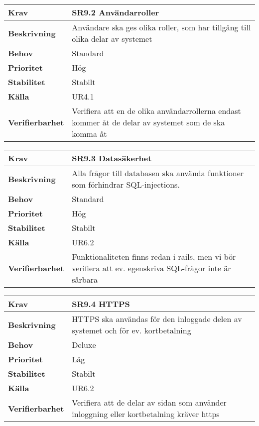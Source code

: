 \documentclass[a4paper, twoside, 11pt, titlepage]{article}
\begin{document}
\begin{tabular} { p{2.6cm} p{12.5cm} }
	\hline
	\sffamily\textbf{Krav} & SR9.2 Användarroller  \\
	\hline
	\sffamily\textbf{Beskrivning} & Användare ska ges olika roller, som har tillgång till olika delar av systemet  \\
	\hline
	\sffamily\textbf{Behov} & Standard  \\
	\hline
	\sffamily\textbf{Prioritet} & Hög  \\
	\hline
	\sffamily\textbf{Stabilitet} & Stabilt  \\
	\hline
	\sffamily\textbf{Källa} & UR4.1  \\
	\hline
	\sffamily\textbf{Verifierbarhet} & Verifiera att en de olika användarrollerna endast kommer åt de delar av systemet som de ska komma åt  \\
	\hline
\end{tabular}
\vspace{6mm}

\begin{tabular} { p{2.6cm} p{12.5cm} }
	\hline
	\sffamily\textbf{Krav} & SR9.3 Datasäkerhet  \\
	\hline
	\sffamily\textbf{Beskrivning} & Alla frågor till databasen ska använda funktioner som förhindrar SQL-injections.  \\
	\hline
	\sffamily\textbf{Behov} & Standard  \\
	\hline
	\sffamily\textbf{Prioritet} & Hög  \\
	\hline
	\sffamily\textbf{Stabilitet} & Stabilt  \\
	\hline
	\sffamily\textbf{Källa} & UR6.2  \\
	\hline
	\sffamily\textbf{Verifierbarhet} & Funktionaliteten finns redan i rails, men vi bör verifiera att ev. egenskriva SQL-frågor inte är sårbara  \\
	\hline
\end{tabular}
\vspace{6mm}

\begin{tabular} { p{2.6cm} p{12.5cm} }
	\hline
	\sffamily\textbf{Krav} & SR9.4 HTTPS   \\
	\hline
	\sffamily\textbf{Beskrivning} & HTTPS ska användas för den inloggade delen av systemet och för ev. kortbetalning  \\
	\hline
	\sffamily\textbf{Behov} & Deluxe  \\
	\hline
	\sffamily\textbf{Prioritet} & Låg  \\
	\hline
	\sffamily\textbf{Stabilitet} & Stabilt  \\
	\hline
	\sffamily\textbf{Källa} & UR6.2  \\
	\hline
	\sffamily\textbf{Verifierbarhet} & Verifiera att de delar av sidan som använder inloggning eller kortbetalning kräver https  \\
	\hline
\end{tabular}
\vspace{6mm}
\end{document}
